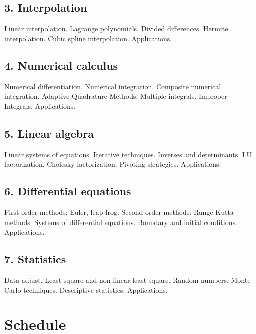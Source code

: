\documentclass[a4,useAMS,usenatbib,usegraphicx,12pt]{article}
\begin{document}
\subsection*{3. Interpolation}
Linear interpolation. Lagrange polynomials. Divided differences. Hermite 
interpolation. Cubic spline interpolation. Applications.

\subsection*{4. Numerical calculus}
Numerical differentiation. Numerical integration. Composite numerical integration.
Adaptive Quadrature Methods. Multiple integrals. Improper Integrals. 
Applications.

\subsection*{5. Linear algebra}
Linear systems of equations. Iterative techniques. Inverses and determinants.
LU factorization. Cholesky factorization. Pivoting strategies. Applications.

\subsection*{6. Differential equations}
First order methods: Euler, leap frog. Second order methods: Runge Kutta methods.
Systems of differential equations. Boundary and initial conditions. Applications.

\subsection*{7. Statistics}
Data adjust. Least square and non-linear least square. Random numbers. Monte 
Carlo techniques. Descriptive statistics. Applications.

\newpage
\section*{Schedule}
\end{document}
